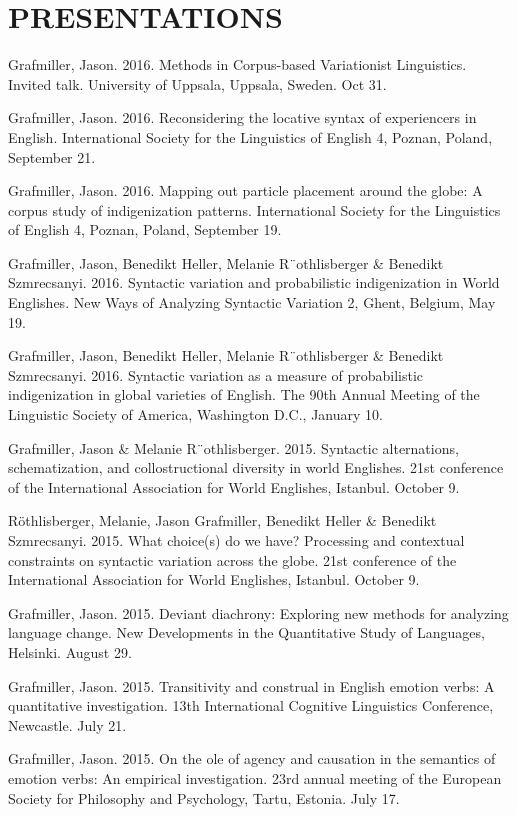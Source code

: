 \documentclass[11pt,]{article}
\begin{document}
\section{PRESENTATIONS}\label{presentations}

Grafmiller, Jason. 2016. Methods in Corpus-based Variationist
Linguistics. Invited talk. University of Uppsala, Uppsala, Sweden. Oct
31.

Grafmiller, Jason. 2016. Reconsidering the locative syntax of
experiencers in English. International Society for the Linguistics of
English 4, Poznan, Poland, September 21.

Grafmiller, Jason. 2016. Mapping out particle placement around the
globe: A corpus study of indigenization patterns. International Society
for the Linguistics of English 4, Poznan, Poland, September 19.

Grafmiller, Jason, Benedikt Heller, Melanie R¨othlisberger \& Benedikt
Szmrecsanyi. 2016. Syntactic variation and probabilistic indigenization
in World Englishes. New Ways of Analyzing Syntactic Variation 2, Ghent,
Belgium, May 19.

Grafmiller, Jason, Benedikt Heller, Melanie R¨othlisberger \& Benedikt
Szmrecsanyi. 2016. Syntactic variation as a measure of probabilistic
indigenization in global varieties of English. The 90th Annual Meeting
of the Linguistic Society of America, Washington D.C., January 10.

Grafmiller, Jason \& Melanie R¨othlisberger. 2015. Syntactic
alternations, schematization, and collostructional diversity in world
Englishes. 21st conference of the International Association for World
Englishes, Istanbul. October 9.

Röthlisberger, Melanie, Jason Grafmiller, Benedikt Heller \& Benedikt
Szmrecsanyi. 2015. What choice(s) do we have? Processing and contextual
constraints on syntactic variation across the globe. 21st conference of
the International Association for World Englishes, Istanbul. October 9.

Grafmiller, Jason. 2015. Deviant diachrony: Exploring new methods for
analyzing language change. New Developments in the Quantitative Study of
Languages, Helsinki. August 29.

Grafmiller, Jason. 2015. Transitivity and construal in English emotion
verbs: A quantitative investigation. 13th International Cognitive
Linguistics Conference, Newcastle. July 21.

Grafmiller, Jason. 2015. On the ole of agency and causation in the
semantics of emotion verbs: An empirical investigation. 23rd annual
meeting of the European Society for Philosophy and Psychology, Tartu,
Estonia. July 17.
\end{document}
